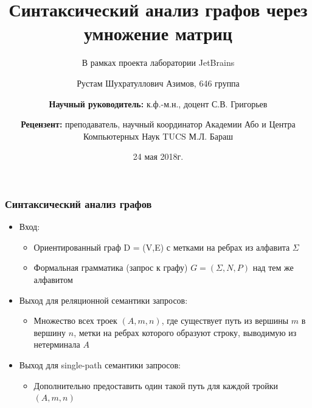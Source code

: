\documentclass{beamer}
\title[]{Синтаксический анализ графов через умножение матриц}
\subtitle[]{В рамках проекта лаборатории JetBrains}
\institute[СПбГУ]{
	Санкт-Петербургский Государственный Университет \\
	Кафедра системного программирования }
\author[Рустам Азимов]{Рустам Шухратуллович Азимов, 646 группа \\
	\and  
	{\bfseries Научный руководитель:} к.ф.-м.н., доцент С.В. Григорьев \\ 
	\and
	{\bfseries Рецензент:} преподаватель, научный координатор Академии Або и Центра Компьютерных Наук TUCS М.Л. Бараш}
\date{24 мая 2018г.}
\begin{document}
{
\begin{frame}
  \titlepage
\end{frame}
}

\begin{frame}[fragile]
	\transwipe[direction=90]
	\frametitle{Синтаксический анализ графов}
	\begin{itemize}
	   \item Вход:
	   \begin{itemize}
	        \item Ориентированный граф D = (V,E) с метками на ребрах из алфавита $\Sigma$
	        \item Формальная грамматика (запрос к графу) $G = (\Sigma,N,P)$ над тем же алфавитом
	   \end{itemize}
	   \item Выход для реляционной семантики запросов:
	   \begin{itemize}
	        \item Множество всех троек $(A, m, n)$, где существует путь из вершины $m$ в вершину $n$, метки на ребрах которого образуют строку, выводимую из нетерминала $A$
	   \end{itemize}
   	   \item Выход для single-path семантики запросов:
   	   \begin{itemize}
   			\item Дополнительно предоставить один такой путь для каждой тройки $(A, m, n)$
   	   \end{itemize}
    \end{itemize}
\end{frame}
\end{document}

